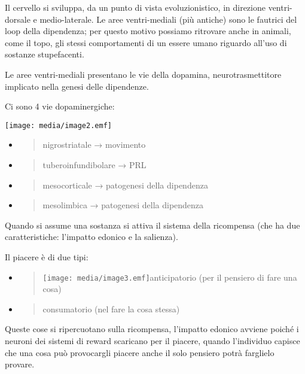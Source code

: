 \documentclass[]{article}
\begin{document}
Il cervello si sviluppa, da un punto di vista evoluzionistico, in
direzione ventri-dorsale e medio-laterale. Le aree ventri-mediali (più
antiche) sono le fautrici del loop della dipendenza; per questo motivo
possiamo ritrovare anche in animali, come il topo, gli stessi
comportamenti di un essere umano riguardo all'uso di sostanze
stupefacenti.

Le aree ventri-mediali presentano le vie della dopamina,
neurotrasmettitore implicato nella genesi delle dipendenze.

Ci sono 4 vie dopaminergiche:

\texttt{[image: media/image2.emf]}

\begin{itemize}
\item
  \begin{quote}
  nigrostriatale → movimento
  \end{quote}
\item
  \begin{quote}
  tuberoinfundibolare → PRL
  \end{quote}
\item
  \begin{quote}
  mesocorticale → patogenesi della dipendenza
  \end{quote}
\item
  \begin{quote}
  mesolimbica → patogenesi della dipendenza
  \end{quote}
\end{itemize}

Quando si assume una sostanza si attiva il sistema della ricompensa (che
ha due caratteristiche: l'impatto edonico e la salienza).

Il piacere è di due tipi:

\begin{itemize}
\item
  \begin{quote}
  \texttt{[image: media/image3.emf]}anticipatorio (per il pensiero di
  fare una cosa)
  \end{quote}
\item
  \begin{quote}
  consumatorio (nel fare la cosa stessa)
  \end{quote}
\end{itemize}

Queste cose si ripercuotano sulla ricompensa, l'impatto edonico avviene
poiché i neuroni dei sistemi di reward scaricano per il piacere, quando
l'individuo capisce che una cosa può provocargli piacere anche il solo
pensiero potrà farglielo provare.
\end{document}
